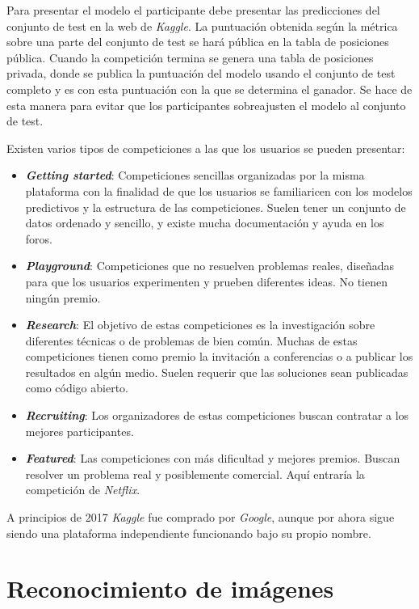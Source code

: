 Para presentar el modelo el participante debe presentar las predicciones del
conjunto de test en la web de \textit{Kaggle}. La puntuación obtenida según la
métrica sobre una parte del conjunto de test se hará pública en la tabla de
posiciones pública. Cuando la competición termina se genera una tabla de
posiciones privada, donde se publica la puntuación del modelo usando el
conjunto de test completo y es con esta puntuación con la que se determina el
ganador. Se hace de esta manera para evitar que los participantes sobreajusten
el modelo al conjunto de test.

Existen varios tipos de competiciones a las que los usuarios se pueden
presentar:

\begin{itemize}
  \item \textit{\textbf{Getting started}}: Competiciones sencillas organizadas por la
      misma plataforma con la finalidad de que los usuarios se familiaricen con
      los modelos predictivos y la estructura de las competiciones. Suelen tener
      un conjunto de datos ordenado y sencillo, y existe mucha documentación y
      ayuda en los foros.
  \item \textit{\textbf{Playground}}: Competiciones que no resuelven problemas
      reales, diseñadas para que los usuarios experimenten y prueben diferentes
      ideas. No tienen ningún premio.
  \item \textit{\textbf{Research}}: El objetivo de estas competiciones es la
      investigación sobre diferentes técnicas o de problemas de bien común.
      Muchas de estas competiciones tienen como premio la invitación a
      conferencias o a publicar los resultados en algún medio. Suelen requerir
      que las soluciones sean publicadas como código abierto.
  \item \textit{\textbf{Recruiting}}: Los organizadores de estas competiciones
      buscan contratar a los mejores participantes.
  \item \textit{\textbf{Featured}}: Las competiciones con más dificultad y
      mejores premios. Buscan resolver un problema real y posiblemente
      comercial. Aquí entraría la competición de \textit{Netflix}.
\end{itemize}

A principios de 2017 \textit{Kaggle} fue comprado por \textit{Google}, aunque por ahora sigue siendo una
plataforma independiente funcionando bajo su propio nombre.

\section{Reconocimiento de imágenes}

